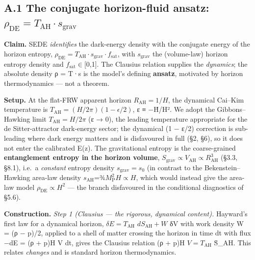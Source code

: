 \documentclass[
  10pt,
]{article}
\begin{document}
\subsection{\texorpdfstring{A.1 The conjugate horizon-fluid ansatz:
\(\rho _{\mathrm{DE}} = T_{\mathrm{AH}}\cdot s_{\mathrm{grav}}\)}{A.1 The conjugate horizon-fluid ansatz: \textbackslash rho \_\{\textbackslash mathrm\{DE\}\} = T\_\{\textbackslash mathrm\{AH\}\}\textbackslash cdot s\_\{\textbackslash mathrm\{grav\}\}}}\label{a.1-the-conjugate-horizon-fluid-ansatz-rho-_mathrmde-t_mathrmahcdot-s_mathrmgrav}

\textbf{Claim.} SEDE \emph{identifies} the dark-energy density with the
conjugate energy of the horizon entropy,
\(\rho _{\mathrm{DE}} = T_{\mathrm{AH}}\cdot s_{\mathrm{grav}}\cdot f_{\mathrm{sat}}\),
with \(s_{\mathrm{grav}}\) the (volume-law) horizon entropy density and
\(f_{\mathrm{sat}} \in  [0\),1{]}. The Clausius relation supplies the
\emph{dynamics}; the absolute density ρ = T·s is the model's defining
\textbf{ansatz}, motivated by horizon thermodynamics --- not a theorem.

\textbf{Setup.} At the flat-FRW apparent horizon
\(R_{\mathrm{AH}} = 1/H\), the dynamical Cai--Kim temperature is
\(T_{\mathrm{AH}} = (H/2\pi )(1 - \epsilon /2)\), ε ≡ −Ḣ/H². We adopt
the Gibbons--Hawking limit \(T_{\mathrm{AH}} = H/2\pi\) (ε → 0), the
leading temperature appropriate for the de Sitter-attractor dark-energy
sector; the dynamical (1 − ε/2) correction is sub-leading where dark
energy matters and is disfavoured in full (§2, §6), so it does not enter
the calibrated E(z). The gravitational entropy is the coarse-grained
\textbf{entanglement entropy in the horizon volume},
\(S_{\mathrm{grav}} \propto  V_{\mathrm{AH}} \propto  R_{\mathrm{AH}}^{3}\)
(§3.3, §8.1), i.e.~a \emph{constant} entropy density
\(s_{\mathrm{grav}} = s_{0}\) (in contrast to the Bekenstein--Hawking
area-law density
\(s_{\mathrm{AH}}\)=¾\(M_{\mathrm{P}}^{2}H \propto  H\), which would
instead give the area-law model \(\rho _{\mathrm{DE}} \propto  H^{2}\)
--- the branch disfavoured in the conditional diagnostics of §5.6).

\textbf{Construction.} \emph{Step 1 (Clausius --- the rigorous,
dynamical content).} Hayward's first law for a dynamical horizon,
\(\delta E = T_{\mathrm{AH}}\) \(dS_{\mathrm{AH}} + W\) δV with work
density W = (ρ − p)/2, applied to a shell of matter crossing the horizon
in time dt with flux −dE = (ρ + p)H V dt, gives the Clausius relation (ρ
+ p)H \(V = T_{\mathrm{AH}}\) Ṡ\_AH. This relates \emph{changes} and is
standard horizon thermodynamics.
\end{document}
